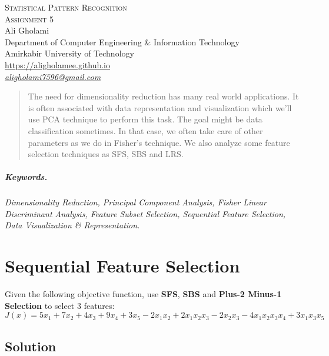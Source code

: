 \documentclass[12pt]{article}
\numberwithin{equation}{section}
\numberwithin{table}{section}
\numberwithin{figure}{section}
\begin{document}

\begin{center}
\textsc{\Large Statistical Pattern Recognition} \\[2pt]
	\textsc{\large Assignment 5}\\
	\vspace{0.5cm}
  Ali Gholami \\[6pt]
  Department of Computer Engineering \& Information Technology\\
  Amirkabir University of Technology  \\[6pt]
  \def\UrlFont{\em}
  \url{https://aligholamee.github.io}\\
    \href{mailto:aligholami7596@gmail.com}{\textit{aligholami7596@gmail.com}}
\end{center}

\begin{abstract}
The need for dimensionality reduction has many real world applications. It is often associated with data representation and visualization which we'll use PCA technique to perform this task. The goal might be data classification sometimes. In that case, we often take care of other parameters as we do in Fisher's technique. We also analyze some feature selection techniques as SFS, SBS and LRS.
\end{abstract}

\subparagraph{Keywords.} \textit{Dimensionality Reduction, Principal Component Analysis, Fisher Linear Discriminant Analysis, Feature Subset Selection, Sequential Feature Selection, Data Visualization \& Representation.}


\section{Sequential Feature Selection}
Given the following objective function, use \textbf{SFS}, \textbf{SBS} and \textbf{Plus-2 Minus-1 Selection} to select 3 features:
$$
	J(x) = 5x_1 + 7x_2 + 4x_3 + 9x_4 + 3x_5 -2x_1x_2 + 2x_1x_2x_3 - 2x_2x_3 - 4x_1x_2x_3x_4 + 3x_1x_3x_5
$$
\subsection*{Solution}
\end{document}
